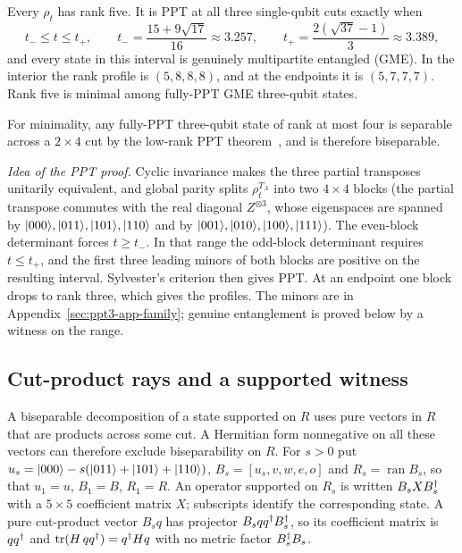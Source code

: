 \begin{theorem}\label{thm:ppt3-family}
Every $\rho_t$ has rank five. It is PPT at all three single-qubit cuts exactly
when
\begin{equation}\label{eq:ppt3-interval}
t_-\le t\le t_+,\qquad t_-=\frac{15+9\sqrt{17}}{16}\approx3.257,\qquad t_+=\frac{2(\sqrt{37}-1)}{3}\approx3.389,
\end{equation}
and every state in this interval is genuinely multipartite entangled (GME). In the interior the rank profile is
$(5,8,8,8)$, and at the endpoints it is $(5,7,7,7)$.
Rank five is minimal among fully-PPT GME three-qubit states.
\end{theorem}

For minimality, any fully-PPT three-qubit state of rank at most
four is separable across a $2\times4$ cut by the low-rank PPT
theorem~\cite{KCKL,HLVC}, and is therefore biseparable.

\emph{Idea of the PPT proof.} Cyclic invariance makes the three partial transposes unitarily equivalent, and global parity
splits $\rho_t^{T_A}$ into two $4\times4$ blocks (the partial transpose commutes with the real diagonal $Z^{\otimes3}$, whose eigenspaces
are spanned by $\lvert000\rangle,\lvert011\rangle,\lvert101\rangle,\lvert110\rangle$ and by $\lvert001\rangle,\lvert010\rangle,\lvert100\rangle,\lvert111\rangle$). The even-block
determinant forces $t\ge t_-$. In that range the odd-block determinant requires $t\le t_+$, and the first three leading
minors of both blocks are positive on the resulting interval. Sylvester's criterion then gives PPT. At an endpoint one block drops
to rank three, which gives the profiles. The minors are in Appendix~\ref{sec:ppt3-app-family}; genuine entanglement is proved
below by a witness on the range.

\subsection{Cut-product rays and a supported witness}\label{sec:ppt3-witness}

A biseparable decomposition of a state supported on $R$ uses pure vectors in $R$ that are products across some
cut. A Hermitian form nonnegative on all these vectors can therefore exclude biseparability on $R$.
For $s>0$ put
$u_s=\lvert000\rangle-s(\lvert011\rangle+\lvert101\rangle+\lvert110\rangle)$, $B_s=[u_s,v,w,e,o]$ and $R_s=\operatorname{ran}B_s$, so that $u_1=u$,
$B_1=B$, $R_1=R$. An operator supported on $R_s$ is written $B_sXB_s^{\dagger}$ with a $5\times5$ coefficient matrix $X$;
subscripts identify the corresponding state. A pure cut-product vector $B_sq$ has
projector $B_sqq^{\dagger} B_s^{\dagger}$, so its coefficient matrix is $qq^{\dagger}$ and $\operatorname{tr}(H\,qq^{\dagger})=q^{\dagger} Hq$ with no metric factor
$B_s^{\dagger} B_s$.

